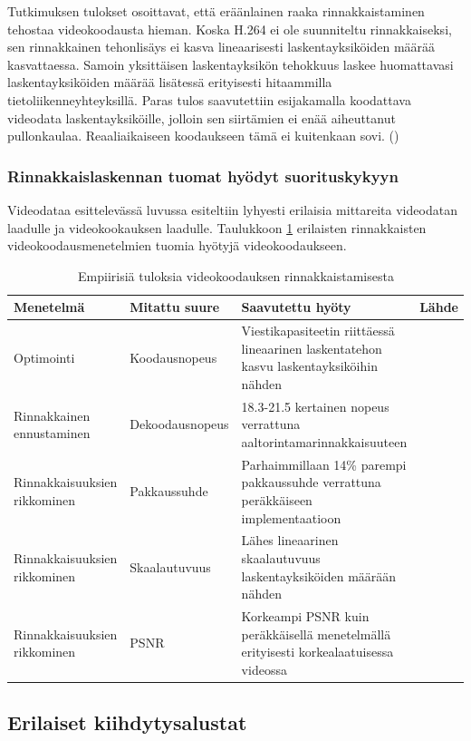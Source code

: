 Tutkimuksen tulokset osoittavat, että eräänlainen raaka rinnakkaistaminen
tehostaa videokoodausta hieman. Koska H.264 ei ole suunniteltu rinnakkaiseksi,
sen rinnakkainen tehonlisäys ei kasva lineaarisesti laskentayksiköiden määrää
kasvattaessa. Samoin yksittäisen laskentayksikön tehokkuus laskee huomattavasi
laskentayksiköiden määrää lisätessä erityisesti hitaammilla
tietoliikenneyhteyksillä. Paras tulos saavutettiin esijakamalla koodattava
videodata laskentayksiköille, jolloin sen siirtämien ei enää aiheuttanut
pullonkaulaa. Reaaliaikaiseen koodaukseen tämä ei
kuitenkaan sovi. (\citealt{li})

\subsubsection{Rinnakkaislaskennan tuomat hyödyt suorituskykyyn}

Videodataa esittelevässä luvussa esiteltiin lyhyesti erilaisia mittareita videodatan
laadulle ja videokookauksen laadulle. Taulukkoon \ref{tab:results}
erilaisten rinnakkaisten videokoodausmenetelmien tuomia hyötyjä
videokoodaukseen.
\begin{longtable}{| p{} | p{}| p{}| p{}|}

	\caption{Empiirisiä tuloksia videokoodauksen rinnakkaistamisesta}
	\label{tab:results}\\
	\hline
	Menetelmä & Mitattu suure & Saavutettu hyöty & Lähde \\
	\hline\hline
	Optimointi & Koodausnopeus & Viestikapasiteetin riittäessä lineaarinen laskentatehon kasvu laskentayksiköihin nähden &
			\citealt{li} \\
	\hline
	Rinnakkainen ennustaminen & Dekoodausnopeus &
			18.3-21.5 kertainen nopeus verrattuna aaltorintamarinnakkaisuuteen & \citealt{pieters} \\
	\hline
	Rinnakkaisuuksien rikkominen & Pakkaussuhde & Parhaimmillaan 14\% parempi pakkaussuhde verrattuna
			peräkkäiseen implementaatioon & \citealt{xu} \\
	\hline
	Rinnakkaisuuksien rikkominen & Skaalautuvuus & Lähes lineaarinen skaalautuvuus laskentayksiköiden määrään nähden &
			\citealt{xu} \\
	\hline
	Rinnakkaisuuksien rikkominen & PSNR & Korkeampi PSNR kuin peräkkäisellä menetelmällä erityisesti korkealaatuisessa videossa &
			\citealt{xu} \\
	\hline 
\end{longtable}
\subsection{Erilaiset kiihdytysalustat}

